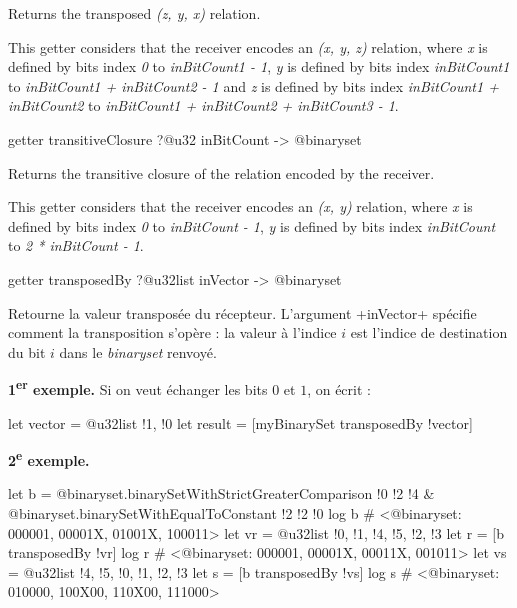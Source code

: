 Returns the transposed \emph{(z, y, x)} relation.

This getter considers that the receiver encodes an \emph{(x, y, z)} relation, where \emph{x} is defined by bits index \emph{0} to \emph{inBitCount1  - 1}, \emph{y} is defined by bits index \emph{inBitCount1} to \emph{inBitCount1 + inBitCount2 - 1} and  \emph{z} is defined by bits index \emph{inBitCount1 + inBitCount2} to \emph{inBitCount1 + inBitCount2 + inBitCount3 - 1}.









\begin{galgas4box}
getter transitiveClosure ?@u32 inBitCount -> @binaryset
\end{galgas4box}


Returns the transitive closure of the relation encoded by the receiver.

This getter considers that the receiver encodes an \emph{(x, y)} relation, where \emph{x} is defined by bits index \emph{0} to \emph{inBitCount  - 1}, \emph{y} is defined by bits index \emph{inBitCount} to \emph{2 * inBitCount - 1}.







\begin{galgas4box}
getter transposedBy ?@u32list inVector -> @binaryset
\end{galgas4box}

Retourne la valeur transposée du récepteur. L'argument \ggsq+inVector+ spécifie comment la transposition s'opère : la valeur à l'indice $i$ est l'indice de destination du bit $i$ dans le \emph{binaryset} renvoyé.

{\bf 1\textsuperscript{er} exemple.} Si on veut échanger les bits $0$ et $1$, on écrit :
\begin{galgas4}
let vector = @u32list {!1, !0}
let result = [myBinarySet transposedBy !vector]
\end{galgas4}

{\bf 2\textsuperscript{e} exemple.}
\begin{galgas4}
  let b = @binaryset.binarySetWithStrictGreaterComparison {!0 !2 !4}
    & @binaryset.binarySetWithEqualToConstant {!2 !2 !0}
  log b # <@binaryset: 000001, 00001X, 01001X, 100011>
  let vr = @u32list {!0, !1, !4, !5, !2, !3}
  let r = [b transposedBy !vr]
  log r # <@binaryset: 000001, 00001X, 00011X, 001011>
  let vs = @u32list {!4, !5, !0, !1, !2, !3}
  let s = [b transposedBy !vs]
  log s # <@binaryset: 010000, 100X00, 110X00, 111000>
\end{galgas4}

